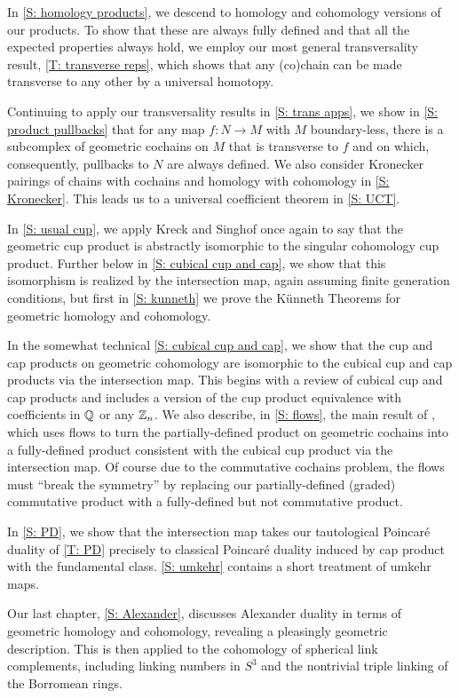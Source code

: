 In \cref{S: homology products}, we descend to homology and cohomology versions of our products.
To show that these are always fully defined and that all the expected properties always hold, we employ our most general transversality result, \cref{T: transverse reps}, which shows that any (co)chain can be made transverse to any other by a universal homotopy.

Continuing to apply our transversality results in \cref{S: trans apps}, we show in \cref{S: product pullbacks} that for any map $f \colon N \to M$ with $M$ boundary-less, there is a subcomplex of geometric cochains on $M$ that is transverse to $f$ and on which, consequently, pullbacks to $N$ are always defined.
We also consider Kronecker pairings of chains with cochains and homology with cohomology in \cref{S: Kronecker}.
This leads us to a universal coefficient theorem in \cref{S: UCT}.

In \cref{S: usual cup}, we apply Kreck and Singhof \cite{Krec10b} once again to say that the geometric cup product is abstractly isomorphic to the singular cohomology cup product.
Further below in \cref{S: cubical cup and cap}, we show that this isomorphism is realized by the intersection map, again assuming finite generation conditions, but first in \cref{S: kunneth} we prove the K\"unneth Theorems for geometric homology and cohomology.

In the somewhat technical \cref{S: cubical cup and cap}, we show that the cup and cap products on geometric cohomology are isomorphic to the cubical cup and cap products via the intersection map.
This begins with a review of cubical cup and cap products and includes a version of the cup product equivalence with coefficients in $\mathbb{Q}$ or any $\mathbb{Z}_n$.
We also describe, in \cref{S: flows}, the main result of \cite{FMS-flows}, which uses flows to turn the partially-defined product on geometric cochains into a fully-defined product consistent with the cubical cup product via the intersection map.
Of course due to the commutative cochains problem, the flows must ``break the symmetry'' by replacing our partially-defined (graded) commutative product with a fully-defined but not commutative product.

In \cref{S: PD}, we show that the intersection map takes our tautological Poincar\'e duality of \cref{T: PD} precisely to classical Poincar\'e duality induced by cap product with the fundamental class.
\cref{S: umkehr} contains a short treatment of umkehr maps.

Our last chapter, \cref{S: Alexander}, discusses Alexander duality in terms of geometric homology and cohomology, revealing a pleasingly geometric description.
This is then applied to the cohomology of spherical link complements, including linking numbers in $S^3$ and the nontrivial triple linking of the Borromean rings.
